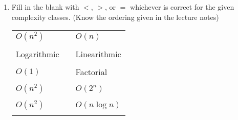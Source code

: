 \documentclass[nobib]{tufte-handout}
\begin{document}
\begin{enumerate}
\begin{enumerate}
      \item Fill in the blank with \( < \), \( > \), or \( = \) whichever is correct for the given complexity classes. (Know the ordering given in the lecture notes)

      \vspace{.2in}
      \begin{tabular}{lll}
        \( O(n^2) \) & \underline{\hspace{2in}} & \( O(n) \) \\ \\
        Logarithmic & \underline{\hspace{2in}} & Linearithmic \\ \\
        \( O(1) \) & \underline{\hspace{2in}} & Factorial \\ \\
        \( O(n^2)\) & \underline{\hspace{2in}} & \( O(2^n) \) \\ \\
        \( O(n^2)\) & \underline{\hspace{2in}} & \( O(n \log n) \) \\ \\
      \end{tabular}
    \end{enumerate}
    

\end{enumerate}
\end{document}
